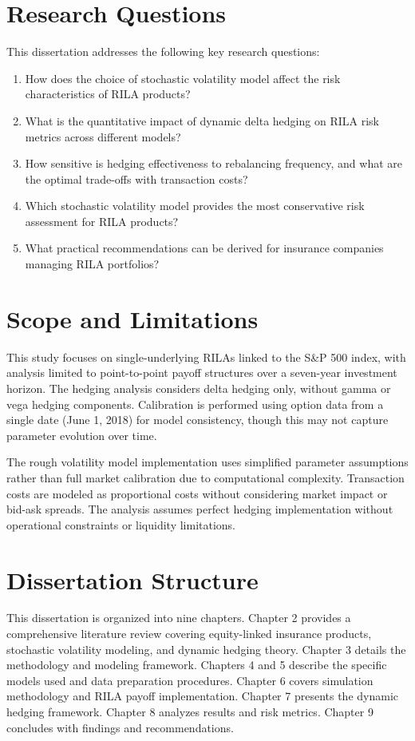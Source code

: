 \documentclass[12pt,a4paper]{report}
\begin{document}
\section{Research Questions}

This dissertation addresses the following key research questions:

\begin{enumerate}
\item How does the choice of stochastic volatility model affect the risk characteristics of RILA products?
\item What is the quantitative impact of dynamic delta hedging on RILA risk metrics across different models?
\item How sensitive is hedging effectiveness to rebalancing frequency, and what are the optimal trade-offs with transaction costs?
\item Which stochastic volatility model provides the most conservative risk assessment for RILA products?
\item What practical recommendations can be derived for insurance companies managing RILA portfolios?
\end{enumerate}

\section{Scope and Limitations}

This study focuses on single-underlying RILAs linked to the S\&P 500 index, with analysis limited to point-to-point payoff structures over a seven-year investment horizon. The hedging analysis considers delta hedging only, without gamma or vega hedging components. Calibration is performed using option data from a single date (June 1, 2018) for model consistency, though this may not capture parameter evolution over time.

The rough volatility model implementation uses simplified parameter assumptions rather than full market calibration due to computational complexity. Transaction costs are modeled as proportional costs without considering market impact or bid-ask spreads. The analysis assumes perfect hedging implementation without operational constraints or liquidity limitations.

\section{Dissertation Structure}

This dissertation is organized into nine chapters. Chapter 2 provides a comprehensive literature review covering equity-linked insurance products, stochastic volatility modeling, and dynamic hedging theory. Chapter 3 details the methodology and modeling framework. Chapters 4 and 5 describe the specific models used and data preparation procedures. Chapter 6 covers simulation methodology and RILA payoff implementation. Chapter 7 presents the dynamic hedging framework. Chapter 8 analyzes results and risk metrics. Chapter 9 concludes with findings and recommendations.
\end{document}
